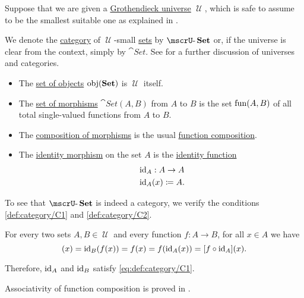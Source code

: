 \begin{definition}\label{def:category_of_small_sets}
  Suppose that we are given a \hyperref[def:grothendieck_universe]{Grothendieck universe} \( \mscrU \), which is safe to assume to be the smallest suitable one as explained in .

  We denote the \hyperref[def:category]{category} of \( \mscrU \)-small \hyperref[def:set]{sets} by \( \ucat{Set} \) or, if the universe is clear from the context, simply by \( \cat{Set} \). See  for a further discussion of universes and categories.

  \begin{itemize}
    \item The \hyperref[def:category/objects]{set of objects} \( \obj(\cat{Set}) \) is \( \mscrU \) itself.

    \item The \hyperref[def:category/morphisms]{set of morphisms} \( \cat{Set}(A, B) \) from \( A \) to \( B \) is the set \hyperref[def:function/set_of_functions]{\( \operatorname{fun}(A, B) \)} of all total single-valued functions from \( A \) to \( B \).

    \item The \hyperref[def:category/composition]{composition of morphisms} is the usual \hyperref[def:set_valued_map/composition]{function composition}.

    \item The \hyperref[def:category/identity]{identity morphism} on the set \( A \) is the \hyperref[def:set_valued_map/identity]{identity function}
    \begin{equation*}
      \begin{aligned}
        &\operatorname{id}_A: A \to A \\
        &\operatorname{id}_A(x) \coloneqq A.
      \end{aligned}
    \end{equation*}
  \end{itemize}
\end{definition}
\begin{defproof}
  To see that \( \ucat{Set} \) is indeed a category, we verify the conditions \ref{def:category/C1} and \ref{def:category/C2}.

   For every two sets \( A, B \in \mscrU \) and every function \( f: A \to B \), for all \( x \in A \) we have
  \begin{equation*}
    [\id_B \bincirc f](x)
    =
    \id_B(f(x))
    =
    f(x)
    =
    f(\id_A(x))
    =
    [f \bincirc \id_A](x).
  \end{equation*}

  Therefore, \( \operatorname{id}_A \) and \( \operatorname{id}_B \) satisfy \eqref{eq:def:category/C1}.

   Associativity of function composition is proved in .
\end{defproof}

